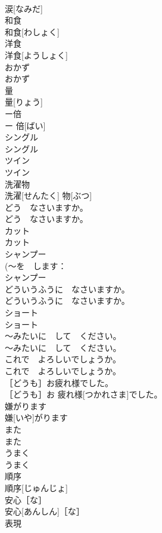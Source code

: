 \documentclass[8pt]{extreport}
\begin{document}
\begin{CJK}{UTF8}{min}
\\	涙[なみだ]	
\\	和食	
\\	和食[わしょく]	
\\	洋食	
\\	洋食[ようしょく]	
\\	おかず	
\\	おかず	
\\	量	
\\	量[りょう]	
\\	ー倍	
\\	ー 倍[ばい]	
\\	シングル	
\\	シングル	
\\	ツイン	
\\	ツイン	
\\	洗濯物	
\\	洗濯[せんたく] 物[ぶつ]	
\\	どう　なさいますか。	
\\	どう　なさいますか。	
\\	カット	
\\	カット	
\\	シャンプー	
\\	(〜を　します：
\\	シャンプー	
\\	どういうふうに　なさいますか。	
\\	どういうふうに　なさいますか。	
\\	ショート	
\\	ショート	
\\	〜みたいに　して　ください。	
\\	〜みたいに　して　ください。	
\\	これで　よろしいでしょうか。	
\\	これで　よろしいでしょうか。	
\\	［どうも］お疲れ様でした。	
\\	［どうも］お 疲れ様[つかれさま]でした。	
\\	嫌がります	
\\	嫌[いや]がります	
\\	また	
\\	また	
\\	うまく	
\\	うまく	
\\	順序	
\\	順序[じゅんじょ]	
\\	安心［な］	
\\	安心[あんしん]［な］	
\\	表現	

\end{CJK}
\end{document}
